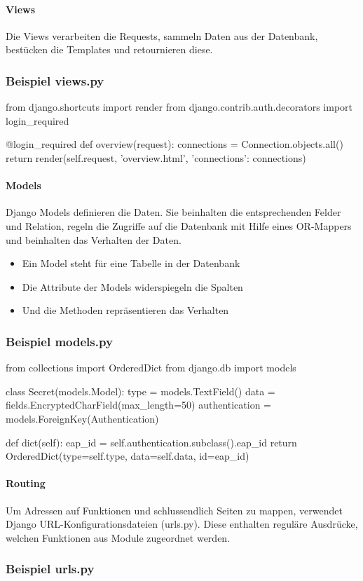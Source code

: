 \paragraph{Views} Die Views verarbeiten die Requests, sammeln Daten aus der Datenbank, bestücken die Templates und retournieren diese.

\subsubsection{Beispiel views.py}
\begin{python}
from django.shortcuts import render
from django.contrib.auth.decorators import login_required

@login_required
def overview(request):
        connections = Connection.objects.all()
        return render(self.request, 'overview.html', {'connections': connections})
\end{python}

\paragraph{Models} Django Models definieren die Daten. Sie beinhalten die entsprechenden Felder und Relation, regeln die Zugriffe auf die Datenbank mit Hilfe eines OR-Mappers und beinhalten das Verhalten der Daten.
\begin{itemize}
	\item Ein Model steht für eine Tabelle in der Datenbank
	\item Die Attribute der Models widerspiegeln die Spalten
	\item Und die Methoden repräsentieren das Verhalten
\end{itemize}

\subsubsection{Beispiel models.py}
\begin{python}
from collections import OrderedDict
from django.db import models

class Secret(models.Model):
    type = models.TextField()
    data = fields.EncryptedCharField(max_length=50)
    authentication = models.ForeignKey(Authentication)

    def dict(self):
        eap_id = self.authentication.subclass().eap_id
        return OrderedDict(type=self.type, data=self.data, id=eap_id)
\end{python}


\paragraph{Routing} Um Adressen auf Funktionen und schlussendlich Seiten zu mappen, verwendet Django URL-Konfigurationsdateien (urls.py). Diese enthalten reguläre Ausdrücke, welchen Funktionen aus Module zugeordnet 
werden.

\subsubsection{Beispiel urls.py}
\newpage